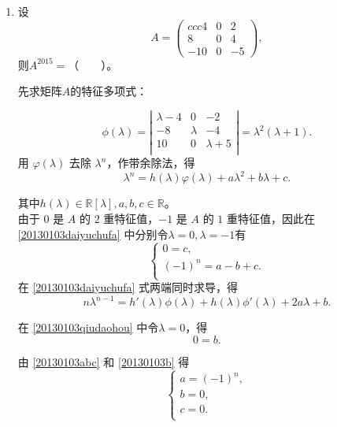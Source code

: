 \begin{enumerate}[1~]
\begin{enumerate}[1.~]
\item
设 
$$
A = \left( \begin{matrix} { c c c } { 4 } & { 0 } & { 2 } \\ { 8 } & { 0 } & { 4 } \\ { - 10 } & { 0 } & { - 5 } \end{matrix} \right),
$$
则$A^{2015}=$（\ \ \ \ ）。

\begin{solution}
先求矩阵$A$的特征多项式：

$$
\phi(\lambda) = \left| \begin{matrix}
	\lambda -4&		0&		-2\\
	-8&		\lambda&		-4\\
	10&		0&		\lambda+5\\
\end{matrix} \right| = \lambda^2 (\lambda+1).
$$
用 $\varphi(\lambda) $ 去除 $\lambda^n$，作带余除法，得\begin{equation}\label{20130103daiyuchufa}
\lambda^n = h(\lambda) \varphi(\lambda) +a \lambda^2+b \lambda +c .\end{equation}

其中$h(\lambda) \in \mathbb{R}[\lambda],a, b, c \in \mathbb{R}$。\\
由于 $0$ 是 $A$ 的 $2$ 重特征值，$-1$ 是 $A$ 的 $1$ 重特征值，因此在  \eqref{20130103daiyuchufa} 中分别令$\lambda = 0, \lambda = -1$有 \begin{equation}\label{20130103abc}
\left\{ \begin{array}{l}
0 = c,\\
(-1)^n = a-b+c.\\
\end{array} \right.\end{equation}
在  \eqref{20130103daiyuchufa} 式两端同时求导，得
\begin{equation} \label{20130103qiudaohou}
n \lambda^{n-1} = h'(\lambda) \phi(\lambda) +h(\lambda) \phi'(\lambda) + 2a\lambda + b.
\end{equation}

在 \eqref{20130103qiudaohou} 中令$\lambda = 0$，得
\begin{equation} \label{20130103b}
0 = b.
\end{equation}

由 \eqref{20130103abc} 和  \eqref{20130103b} 得
$$
\left\{ \begin{array}{l}
a = (-1)^n,\\
b = 0,\\
c = 0.\\
\end{array}\right.
$$


\end{solution}
\end{enumerate}
\end{enumerate}
